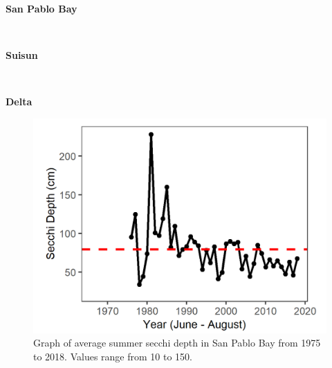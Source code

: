 \documentclass[
]{book}
\begin{document}
\begin{panel-grid}

\begin{columns-nocenter}

\begin{column800}

\textbf{San Pablo Bay}

\end{column800}

\begin{column40}

~

\end{column40}

\begin{column800}

\textbf{Suisun}

\end{column800}

\begin{column40}

~

\end{column40}

\begin{column800}

\textbf{Delta}

\end{column800}

\end{columns-nocenter}

\begin{columns-nocenter}

\begin{column800}

\begin{expand}

\begin{figure}
\includegraphics[width=15.25in]{figures/secchi_splsummer} \caption{Graph of average summer secchi depth in San Pablo Bay from 1975 to 2018. Values range from 10 to 150.}\label{fig:unnamed-chunk-51}
\end{figure}


\end{expand}
\end{column800}
\end{columns-nocenter}
\end{panel-grid}
\end{document}
